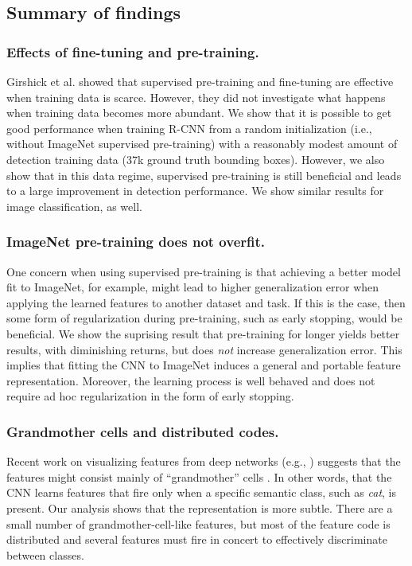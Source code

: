 
\subsection{Summary of findings}

\subsubsection{Effects of fine-tuning and pre-training.} 
Girshick et al. \cite{Rcnn} showed that supervised pre-training and fine-tuning are effective when training data is scarce.
However, they did not investigate what happens when training data becomes more abundant.
We show that it is possible to get good performance when training R-CNN from a random initialization (i.e., without ImageNet supervised pre-training) with a reasonably modest amount of detection training data (37k ground truth bounding boxes).
However, we also show that in this data regime, supervised pre-training is still beneficial and leads to a large improvement in detection performance.
We show similar results for image classification, as well.

\subsubsection{ImageNet pre-training does not overfit.}
One concern when using supervised pre-training is that achieving a better model fit to ImageNet, for example, might lead to higher generalization error when applying the learned features to another dataset and task.
If this is the case, then some form of regularization during pre-training, such as early stopping, would be beneficial.
We show the suprising result that pre-training for longer yields better results, with diminishing returns, but does \emph{not} increase generalization error.
This implies that fitting the CNN to ImageNet induces a general and portable feature representation.
Moreover, the learning process is well behaved and does not require ad hoc regularization in the form of early stopping.

\subsubsection{Grandmother cells and distributed codes.}
Recent work on visualizing features from deep networks (e.g., \cite{GoogleCat,DeConv}) suggests that the features might consist mainly of ``grandmother'' cells \cite{Barlow,Grandmother}.
In other words, that the CNN learns features that fire only when a specific semantic class, such as \emph{cat}, is present.
Our analysis shows that the representation is more subtle.
There are a small number of grandmother-cell-like features, but most of the feature code is distributed and several features must fire in concert to effectively discriminate between classes.

